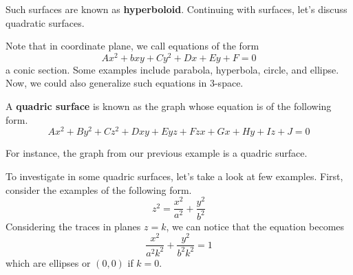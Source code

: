 \documentclass[../../../main.tex]{subfiles}
\begin{document}
\begin{solution}
\begin{minipage}{0.46\textwidth}
\begin{figure}[H]
\end{figure}
\end{minipage}
\hfill
\begin{minipage}{0.46\textwidth}
\end{minipage}
\end{solution}

Such surfaces are known as \textbf{hyperboloid}. Continuing with
surfaces, let's discuss quadratic surfaces.

Note that in coordinate plane, we call equations of the form
\[
Ax^2 + bxy + Cy^2 + Dx + Ey + F = 0
\]
a conic section. Some examples include parabola, hyperbola, circle,
and ellipse. Now, we could also generalize such equations in 3-space.

\begin{definition}{}{}
A \textbf{quadric surface} is known as the graph whose equation is
of the following form.
\vspace{-0.8\baselineskip}
\[
Ax^2 + By^2 + Cz^2 + Dxy + Eyz + Fzx + Gx + Hy + Iz + J = 0
\]
\end{definition}

For instance, the graph from our previous example is a quadric
surface.

To investigate in some quadric surfaces, let's take a look at
few examples. First, consider the examples of the following form.
\[
z^2 = \frac{x^2}{a^2} + \frac{y^2}{b^2}
\]
Considering the traces in planes $z = k$, we can notice that the
equation becomes
\[
\frac{x^2}{a^2 k^2} + \frac{y^2}{b^2 k^2} = 1
\]
which are ellipses or $(0, 0)$ if $k = 0$.
\end{document}
